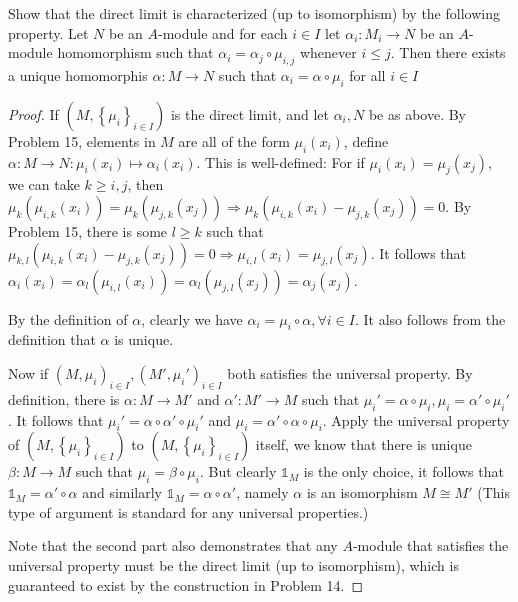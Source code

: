 \documentclass{solution}
\begin{document}
\begin{problem}
    Show that the direct limit is characterized (up to isomorphism) by the following property. Let $N$ be an $A$-module and for each $i \in I$ let $\alpha_{i}: M_i \rightarrow N$ be an $A$-module homomorphism such that $\alpha_{i} = \alpha_j \circ \mu_{i, j}$ whenever $i \le j$. Then there exists a unique homomorphis $\alpha: M \rightarrow N$ such that $\alpha_i = \alpha \circ \mu_i$ for all $i \in I$
\end{problem}

\begin{proof}
    If $(M, \left\lbrace \mu_i \right\rbrace_{i \in I})$ is the direct limit, and let $\alpha_i, N$ be as above. By Problem 15, elements in $M$ are all of the form $\mu_i(x_i)$, define $\alpha: M \rightarrow N: \mu_i(x_i) \mapsto \alpha_i(x_i)$. This is well-defined: For if $\mu_i(x_i) = \mu_j(x_j)$, we can take $k \ge i, j$, then $\mu_{k}(\mu_{i, k}(x_i)) = \mu_k(\mu_{j, k}(x_j)) \Rightarrow \mu_k(\mu_{i, k}(x_i) - \mu_{j, k}(x_j)) = 0$. By Problem 15, there is some $l \ge k$ such that $\mu_{k, l} (\mu_{i, k}(x_i) - \mu_{j, k}(x_j)) = 0 \Rightarrow \mu_{i, l} (x_i) = \mu_{j, l}(x_j)$. It follows that $\alpha_i(x_i) = \alpha_l(\mu_{i, l}(x_i)) = \alpha_l(\mu_{j, l}(x_j)) = \alpha_j(x_j)$.

    By the definition of $\alpha$, clearly we have $\alpha_i = \mu_i \circ \alpha, \forall i \in I$. It also follows from the definition that $\alpha$ is unique.

    Now if $(M, \mu_i)_{i \in I}, (M', \mu_i')_{i \in I}$ both satisfies the universal property. By definition, there is $\alpha: M \rightarrow M'$ and $\alpha': M' \rightarrow M$ such that $\mu_i' = \alpha \circ \mu_i, \mu_i = \alpha' \circ \mu_i'$. It follows that $\mu_i' = \alpha \circ \alpha' \circ \mu_i'$ and $\mu_i = \alpha' \circ \alpha \circ \mu_i$. Apply the universal property of $(M, \left\lbrace \mu_i \right\rbrace_{i \in I})$ to $(M, \left\lbrace \mu_i \right\rbrace_{i \in I})$ itself, we know that there is unique $\beta: M \rightarrow M$ such that $\mu_i = \beta \circ \mu_i$. But clearly $\mathds{1}_M$ is the only choice, it follows that $\mathds{1}_M = \alpha' \circ \alpha$ and similarly $\mathds{1}_M = \alpha \circ \alpha'$, namely $\alpha$ is an isomorphism $M \cong M'$ (This type of argument is standard for any universal properties.)

    Note that the second part also demonstrates that any $A$-module that satisfies the universal property must be the direct limit (up to isomorphism), which is guaranteed to exist by the construction in Problem 14.
\end{proof}
\end{document}
